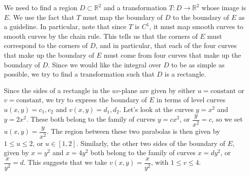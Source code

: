 {We need to find a region $D\subset \mathbb{R}^2$ and a transformation $T:D\to \mathbb{R}^2$ whose image is $E$. We use the fact that $T$ must map the boundary of $D$ to the boundary of $E$ as a guideline. In particular, note that since $T$ is $C^1$, it must map smooth curves to smooth curves by the chain rule. This tells us that the corners of $E$ must correspond to the corners of $D$, and in particular, that each of the four curves that make up the boundary of $E$ must come from four curves that make up the boundary of $D$. Since we would like the integral over $D$ to be as simple as possible, we try to find a transformation such that $D$ is a rectangle.


Since the sides of a rectangle in the $uv$-plane are given by either $u=\text{constant}$ or $v=\text{constant}$, we try to express the boundary of $E$ in terms of level curves $u(x,y)=c_1, c_2$ and $v(x,y)=d_1,d_2$. Let's look at the curves $y=x^2$ and $y=2x^2$. These both belong to the family of curves $y=cx^2$, or $\dfrac{y}{x^2}=c$, so we set $u(x,y) = \dfrac{y}{x^2}$. The region between these two parabolas is then given by $1\leq u\leq 2$, or $u\in [1,2]$. Similarly, the other two sides of the boundary of $E$, given by $x=y^2$ and $x=4y^2$ both belong to the family of curves $x=dy^2$, or $\dfrac{x}{y^2}=d$. This suggests that we take $v(x,y)=\dfrac{x}{y^2}$, with $1\leq v\leq 4$.

}
